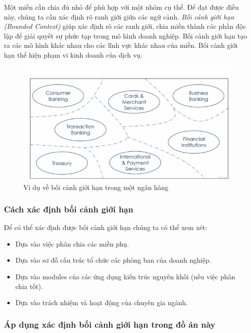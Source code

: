 
 Một miền cần chia đủ nhỏ để phù hợp với một nhóm cụ thể. Để đạt được điều này, chúng ta cần xác định rõ ranh giới giữa các ngữ cảnh.   \emph{ Bối cảnh giới hạn (Bounded Context) } giúp xác  định rõ các ranh giới, chia miền thành các phần độc lập để giải quyết sự phức tạp trong mô hình doanh nghiệp.    Bối cảnh giới hạn tạo ra các mô hình khác nhau cho các lĩnh vực khác nhau của miền.  Bối cảnh giới hạn thể hiện phạm vi kinh doanh của dịch vụ.


\begin{figure}[H]

\centering

\includegraphics[scale =  1]{pictures/boi_canh_gioi_han/main.png}

\caption{Ví dụ về bối cảnh giới hạn trong một ngân hàng}

\end{figure}

    \subsubsection{Cách xác định bối cảnh giới hạn}
Để có thể         xác định được bối cảnh giới hạn chúng ta có thể xem xét: 


\begin{itemize}

\item Dựa vào việc  phân chia các miền phụ.

\item Dựa vào sơ đồ cấu trúc tổ chức các phòng ban của doanh nghiệp.

\item Dựa vào modules của các ứng dụng kiến trúc nguyên khối (nếu việc phân chia tốt).

\item Dựa vào trách nhiệm và hoạt động của chuyên gia ngành.

\end{itemize}


\subsubsection{Áp dụng xác định bối cảnh giới hạn trong đồ án này}

